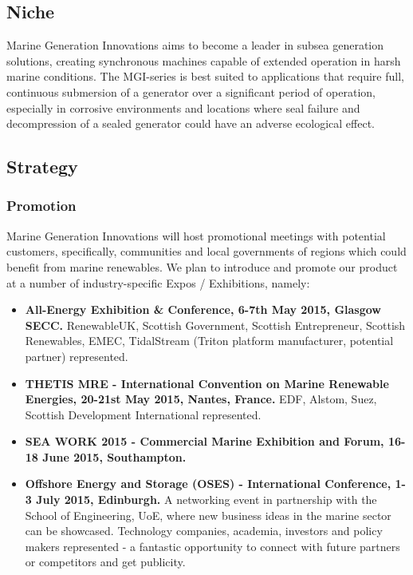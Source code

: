 \documentclass[a4paper,11pt]{article}
\begin{document}
\subsection{Niche}
Marine Generation Innovations aims to become a leader in subsea generation solutions, creating synchronous machines capable of extended operation in harsh marine conditions. The MGI-series is best suited to applications that require full, continuous submersion of a generator over a significant period of operation, especially in corrosive environments and locations where seal failure and decompression of a sealed generator could have an adverse ecological effect.

\subsection{Strategy}

\subsubsection{Promotion}
Marine Generation Innovations will host promotional meetings with potential customers, specifically, communities and local governments of regions which could benefit from marine renewables. We plan to introduce and promote our product at a number of industry-specific Expos / Exhibitions, namely:

\begin{itemize}
	\item \textbf{All-Energy Exhibition \& Conference, 6-7th May 2015, Glasgow SECC.} RenewableUK, Scottish Government, Scottish Entrepreneur, Scottish Renewables, EMEC, TidalStream (Triton platform manufacturer, potential partner) represented.
	\item \textbf{THETIS MRE - International Convention on Marine Renewable Energies, 20-21st May 2015, Nantes, France.} EDF, Alstom, Suez, Scottish Development International represented.
	\item \textbf{SEA WORK 2015 - Commercial Marine Exhibition and Forum, 16-18 June 2015, Southampton.}
	\item \textbf{Offshore Energy and Storage (OSES) - International Conference, 1-3 July 2015, Edinburgh.} A networking event in partnership with the School of Engineering, UoE, where new business ideas in the marine sector can be showcased. Technology companies, academia, investors and policy makers represented - a fantastic opportunity to connect with future partners or competitors and get publicity.
\end{itemize}
\end{document}
